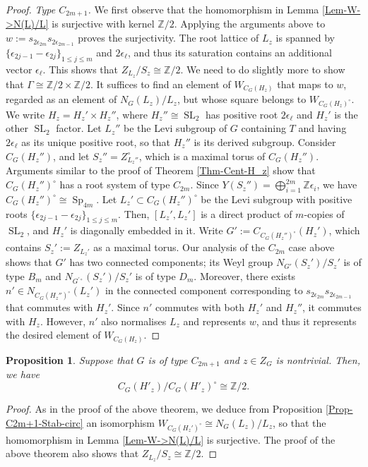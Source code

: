 \documentclass[11pt,oneside,dvipsnames]{amsart}
\theoremstyle{plain}
\newtheorem{Prop}[Thm]{Proposition}
\theoremstyle{definition}
\theoremstyle{named}
\DeclareMathOperator{\SL}{SL}
\DeclareMathOperator{\Sp}{Sp}
\begin{document}
\begin{proof}
\textit{Type $C_{2m+1}$.} We first observe that the homomorphism in Lemma \ref{Lem-W->N(L)/L} is surjective with kernel $\mathbb{Z}/2$. Applying the arguments above to $w:=s_{2\epsilon_{2m}}s_{2\epsilon_{2m-1}}$ proves the surjectivity. The root lattice of $L_z$ is spanned by $\{\epsilon_{2j-1}-\epsilon_{2j}\}_{1\le j\le m}$ and $2\epsilon_{\ell}$, and thus its saturation contains an additional vector $\epsilon_{\ell}$. This shows that $Z_{L_z}/S_z\cong\mathbb{Z}/2$. We need to do slightly more to show that $\Gamma\cong\mathbb{Z}/2\times\mathbb{Z}/2$. It suffices to find an element of $W_{C_G(H_z)}$ that maps to $w$, regarded as an element of $N_G(L_z)/L_z$, but whose square belongs to $W_{C_G(H_z)^{\circ}}$. We write $H_z=H_z'\times H_z''$, where $H_z''\cong\SL_2$ has positive root $2\epsilon_{\ell}$ and $H_z'$ is the other $\SL_2$ factor. Let $L_z''$ be the Levi subgroup of $G$ containing $T$ and having $2\epsilon_{\ell}$ as its unique positive root, so that $H_z''$ is its derived subgroup. Consider $C_G(H_z'')$, and let $S_z''=Z_{L_z''}^{\circ}$, which is a maximal torus of $C_G(H_z'')$. Arguments similar to the proof of Theorem \ref{Thm-Cent-H_z} show that $C_G(H_z'')^{\circ}$ has a root system of type $C_{2m}$. Since $Y(S_z'')=\bigoplus_{i=1}^{2m}\mathbb{Z}\epsilon_i$, we have $C_G(H_z'')^{\circ}\cong\Sp_{4m}$. Let $L_z'\subset C_G(H_z'')^{\circ}$ be the Levi subgroup with positive roots $\{\epsilon_{2j-1}-\epsilon_{2j}\}_{1\le j\le m}$. Then, $[L_z',L_z']$ is a direct product of $m$-copies of $\SL_2$, and $H_z'$ is diagonally embedded in it. Write $G':=C_{C_G(H_z'')^{\circ}}(H_z')$, which contains $S_z':=Z_{L_z'}$ as a maximal torus. Our analysis of the $C_{2m}$ case above shows that $G'$ has two connected components; its Weyl group $N_{G'}(S_z')/S_z'$ is of type $B_m$ and $N_{G^{\prime\circ}}(S_z')/S_z'$ is of type $D_m$. Moreover, there exists $n'\in N_{C_G(H_z'')^{\circ}}(L_z')$ in the connected component corresponding to $s_{2\epsilon_{2m}}s_{2\epsilon_{2m-1}}$ that commutes with $H_z'$. Since $n'$ commutes with both $H_z'$ and $H_z''$, it commutes with $H_z$. However, $n'$ also normalises $L_z$ and represents $w$, and thus it represents the desired element of $W_{C_G(H_z)}$.
\end{proof}

\begin{Prop}\label{Prop-Gamma-G'-z}
Suppose that $G$ is of type $C_{2m+1}$ and $z\in Z_G$ is nontrivial. Then, we have 
$$
C_G(H'_z)/C_G(H'_z)^{\circ}\cong\mathbb{Z}/2.
$$
\end{Prop}
\begin{proof}
As in the proof of the above theorem, we deduce from Proposition \ref{Prop-C2m+1-Stab-circ} an isomorphism $W_{C_G(H_z')^{\circ}}\cong N_G(L_z)/L_z$, so that the homomorphism in Lemma \ref{Lem-W->N(L)/L} is surjective. The proof of the above theorem also shows that $Z_{L_z}/S_z\cong\mathbb{Z}/2$.
\end{proof}
\end{document}
